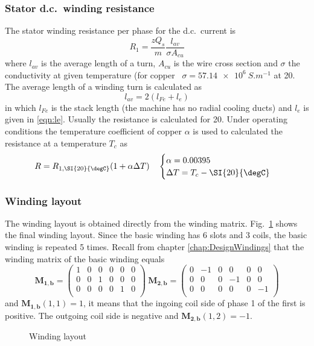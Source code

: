 \subsubsection{Stator d.c.~winding resistance}
The stator winding resistance per phase for the d.c.~current is 
\begin{equation}
  \label{eqn:R1a}
  R_1 =  \frac{zQ_s}{m} \frac{l_{av}}{\sigma A_{cu}}
\end{equation}
where $l_{av}$ is the average length of a turn, $A_{cu}$ is the wire cross section and $\sigma$ the conductivity at given temperature (for copper~%
$\sigma = \SI{57.14e6}{S.m^{-1}}$ at \SI{20}{\degC}. The average length of a winding turn is calculated as
\begin{equation}
  \label{eqn:lav}
  l_{av} = 2(l_{Fe}+l_e)
\end{equation} 
in which $l_{Fe}$ is the stack length (the machine has no radial cooling ducts) and $l_e$ is given in \eqref{eqn:le}. Usually the resistance is calculated for \SI{20}{\degC}. Under operating conditions the temperature coefficient of copper $\alpha$ is used to calculated the resistance at a temperature $T_c$ as
\begin{equation}
  R = R_{1,\SI{20}{\degC}}(1+\alpha \Delta T)
  \quad
  \begin{cases}
  \alpha = 0.00395\\
  \Delta T = T_c-\SI{20}{\degC}
  \end{cases}
\end{equation} 

\subsubsection{Winding layout}
The winding layout is obtained directly from the winding matrix. Fig.~\ref{fig:w_layout} shows the final winding layout. Since the basic winding has 6 slots and 3 coils, the basic winding is repeated 5 times. Recall from chapter \ref{chap:DesignWindings} that the winding matrix of the basic winding equals 
\begin{equation}
  \mathbf{M_{1,b}} = 
  \begin{pmatrix}
  1&0&0&0&0&0\\
  0&0&1&0&0&0\\
  0&0&0&0&1&0\\
  \end{pmatrix} \
  \mathbf{M_{2,b}} = 
  \begin{pmatrix}
  0&-1&0&0 &0&0 \\
  0&0 &0&-1&0&0 \\
  0&0 &0&0 &0&-1\\
  \end{pmatrix} 
\end{equation}
and $\mathbf{M_{1,b}}(1,1)=1$, it means that the ingoing coil side of phase 1 of the first is positive. The outgoing coil side is negative and $\mathbf{M_{2,b}}(1,2)=-1$. 
\begin{figure}[htbp]
	\centering
		
	\caption{Winding layout}
	\label{fig:w_layout}
\end{figure}

